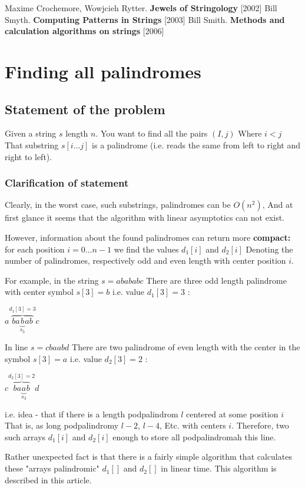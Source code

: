 Maxime Crochemore, Wowjcieh Rytter. \textbf{Jewels of Stringology} [2002]
Bill Smyth. \textbf{Computing Patterns in Strings} [2003]
Bill Smith. \textbf{Methods and calculation algorithms on strings} [2006]

\section{ Finding all palindromes }
\subsection{ Statement of the problem }

Given a string $s$ length $n$. You want to find all the pairs $(I, j)$ Where $i <j$ That substring $s [i \ldots j]$ is a palindrome (i.e. reads the same from left to right and right to left).

\subsubsection{ Clarification of statement }

Clearly, in the worst case, such substrings, palindromes can be $O (n ^ 2)$, And at first glance it seems that the algorithm with linear asymptotics can not exist.

However, information about the found palindromes can return more \textbf{compact:} for each position $i = 0 \ldots n-1$ we find the values $d_1 [i]$ and $d_2 [i]$ Denoting the number of palindromes, respectively odd and even length with center position $i$.

For example, in the string $s = abababc$ There are three odd length palindrome with center symbol $s [3] = b$ i.e. value $d_1 [3] = 3$ :

$a\overbrace{ba\underbrace{b}_{s_{3}}ab}^{d_{1}[3]=3}c$

In line $s = cbaabd$ There are two palindrome of even length with the center in the symbol $s [3] = a$ i.e. value $d_2 [3] = 2$ :

$c\overbrace{ba\underbrace{a}_{s_{3}}b}^{d_{2}[3]=2}d$

i.e. idea - that if there is a length podpalindrom $l$ centered at some position $i$ That is, as long podpalindromy $l-2$, $l-4$, Etc. with centers $i$. Therefore, two such arrays $d_1 [i]$ and $d_2 [i]$ enough to store all podpalindromah this line.

Rather unexpected fact is that there is a fairly simple algorithm that calculates these "arrays palindromic" $d_1 []$ and $d_2 []$ in linear time. This algorithm is described in this article.

